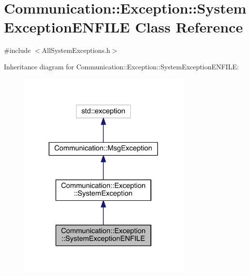 \hypertarget{class_communication_1_1_exception_1_1_system_exception_e_n_f_i_l_e}{}\section{Communication\+:\+:Exception\+:\+:System\+Exception\+E\+N\+F\+I\+L\+E Class Reference}
\label{class_communication_1_1_exception_1_1_system_exception_e_n_f_i_l_e}


{\ttfamily \#include $<$All\+System\+Exceptions.\+h$>$}



Inheritance diagram for Communication\+:\+:Exception\+:\+:System\+Exception\+E\+N\+F\+I\+L\+E\+:\nopagebreak
\begin{figure}[H]
\begin{center}
\leavevmode
\includegraphics[width=248pt]{class_communication_1_1_exception_1_1_system_exception_e_n_f_i_l_e__inherit__graph}
\end{center}
\end{figure}


